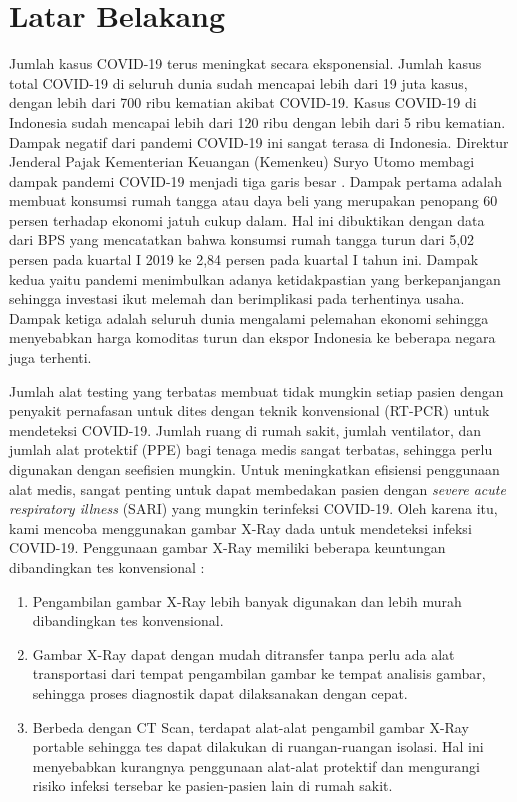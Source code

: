 \documentclass{article}
\begin{document}
  \section{Latar Belakang}
   Jumlah kasus COVID-19 terus meningkat secara eksponensial. Jumlah kasus total COVID-19 di seluruh dunia sudah mencapai lebih dari 19 juta kasus, dengan lebih dari 700 ribu kematian akibat COVID-19. Kasus COVID-19 di Indonesia sudah mencapai lebih dari 120 ribu dengan lebih dari 5 ribu kematian. Dampak negatif dari pandemi COVID-19 ini sangat terasa di Indonesia. Direktur Jenderal Pajak Kementerian Keuangan (Kemenkeu) Suryo Utomo membagi dampak pandemi COVID-19 menjadi tiga garis besar \cite{zuraya}. Dampak pertama adalah membuat konsumsi rumah tangga atau daya beli yang merupakan penopang 60 persen terhadap ekonomi jatuh cukup dalam. Hal ini dibuktikan dengan data dari BPS yang mencatatkan bahwa konsumsi rumah tangga turun dari 5,02 persen pada kuartal I 2019 ke 2,84 persen pada kuartal I tahun ini. Dampak kedua yaitu pandemi menimbulkan adanya ketidakpastian yang berkepanjangan sehingga investasi ikut melemah dan berimplikasi pada terhentinya usaha. Dampak ketiga adalah seluruh dunia mengalami pelemahan ekonomi sehingga menyebabkan harga komoditas turun dan ekspor Indonesia ke beberapa negara juga terhenti. 
   \par
   Jumlah alat testing yang terbatas membuat tidak mungkin setiap pasien dengan penyakit pernafasan untuk dites dengan teknik konvensional (RT-PCR) untuk mendeteksi COVID-19. Jumlah ruang di rumah sakit, jumlah ventilator, dan jumlah alat protektif (PPE) bagi tenaga medis sangat terbatas, sehingga perlu digunakan dengan seefisien mungkin. Untuk meningkatkan efisiensi penggunaan alat medis, sangat penting untuk dapat membedakan pasien dengan \textit{severe acute respiratory illness} (SARI) yang mungkin terinfeksi COVID-19. Oleh karena itu, kami mencoba menggunakan gambar X-Ray dada untuk mendeteksi infeksi COVID-19.
   Penggunaan gambar X-Ray memiliki beberapa keuntungan dibandingkan tes konvensional \cite{mangal} :
   
   \begin{enumerate}
   	\item Pengambilan gambar X-Ray lebih banyak digunakan dan lebih murah dibandingkan tes konvensional.
   	\item Gambar X-Ray dapat dengan mudah ditransfer tanpa perlu ada alat transportasi dari tempat pengambilan gambar ke tempat analisis gambar, sehingga proses diagnostik dapat dilaksanakan dengan cepat.
   	\item Berbeda dengan CT Scan, terdapat alat-alat pengambil gambar X-Ray portable sehingga tes dapat dilakukan di ruangan-ruangan isolasi. Hal ini menyebabkan kurangnya penggunaan alat-alat protektif dan mengurangi risiko infeksi tersebar ke pasien-pasien lain di rumah sakit.
   \end{enumerate}
 
\end{document}
